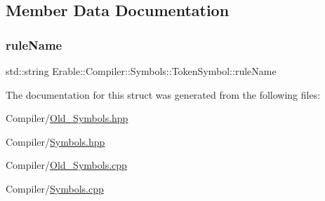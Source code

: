 \subsection{Member Data Documentation}
\mbox{\label{class_erable_1_1_compiler_1_1_symbols_1_1_token_symbol_aedef0a5b3fef634067b62c93934ecb08}} 
\subsubsection{\texorpdfstring{ruleName}{ruleName}}
{\footnotesize\ttfamily std\+::string Erable\+::\+Compiler\+::\+Symbols\+::\+Token\+Symbol\+::rule\+Name}



The documentation for this struct was generated from the following files\+:\begin{DoxyCompactItemize}
\item 
Compiler/\mbox{\hyperlink{_old___symbols_8hpp}{Old\+\_\+\+Symbols.\+hpp}}\item 
Compiler/\mbox{\hyperlink{_symbols_8hpp}{Symbols.\+hpp}}\item 
Compiler/\mbox{\hyperlink{_old___symbols_8cpp}{Old\+\_\+\+Symbols.\+cpp}}\item 
Compiler/\mbox{\hyperlink{_symbols_8cpp}{Symbols.\+cpp}}\end{DoxyCompactItemize}
